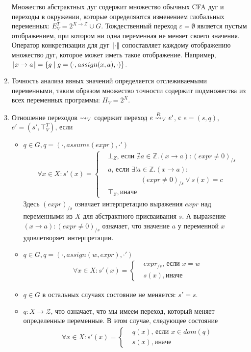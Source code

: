 \begin{enumerate}
Множество абстрактных дуг содержит множество обычных CFA дуг и переходы в окружении, которые определяются изменением глобальных переменных:
$E^T_V = 2^{X \to \mathcal{Z}} \cup G$.
Тождественный переход $\varepsilon = \emptyset$ является пустым отображением, при котором ни одна переменная не меняет своего значения.
Оператор конкретизации для дуг $\lvert \! \lvert \cdot \rvert \! \rvert$ сопоставляет каждому отображению множество дуг, которое может иметь такое отображение.
Например, $\lvert \! \lvert x \to a \rvert \! \rvert = \{g \mid g = (\cdot, assign(x, a), \cdot)\}$.

\item Точность анализа явных значений определяется отслеживаемыми переменными, таким образом множество точности содержит подмножества из всех переменных программы:  $\Pi_V = 2^X$.

\item Отношение переходов $\leadsto_V$ содержит переход $e \stackrel{R}{\leadsto}_V e'$, с $e=(s,q)$, $e' =(s', \top^T_V)$, если 
\begin{itemize}
\item $q \in G, q=(\cdot,assume(expr),\cdot')$ 
\begin{align*}
&\forall x \in X: s'(x) = 
\begin{cases}
& \bot_Z \mbox{, если } \nexists a \in \mathbb{Z}. (x \rightarrow a) : (expr\neq 0)_{/s} \\
& a \mbox{, если } \exists !a \in \mathbb{Z}. (x \rightarrow a) : \\
& \hspace{2cm} (expr\neq 0)_{/s} \lor s(x) = c \\
& \top_Z{, иначе }
\end{cases}
\end{align*}
Здесь $(expr)_{/s}$ означает интерпретацию выражения $expr$ над переменными из $X$ для абстрактного присваивания $s$.
А выражение $(x \rightarrow a) : (expr\neq 0)_{/s}$ означает, что значение $a$ у переменной $x$ удовлетворяет интерпретации.
\item $q \in G, q=(\cdot,assign(w, expr),\cdot')$ 
\begin{align*}
&\forall x \in X: s'(x) = 
\begin{cases}
& expr_{/s} \mbox{, если } x = w \\
& s(x){, иначе }
\end{cases}
\end{align*}
\item $q \in G$ в остальных случаях состояние не меняется: $s' = s$. 
\item $q: X \to \mathcal{Z}$, что означает, что мы имеем переход, который меняет определенные переменные.
В этом случае, следующее состояние
\begin{align*}
&\forall x \in X: s'(x) = 
\begin{cases}
& q(x) \mbox{, если } x \in dom(q) \\
& s(x){, иначе }
\end{cases}
\end{align*}
\end{itemize}


\end{enumerate}
